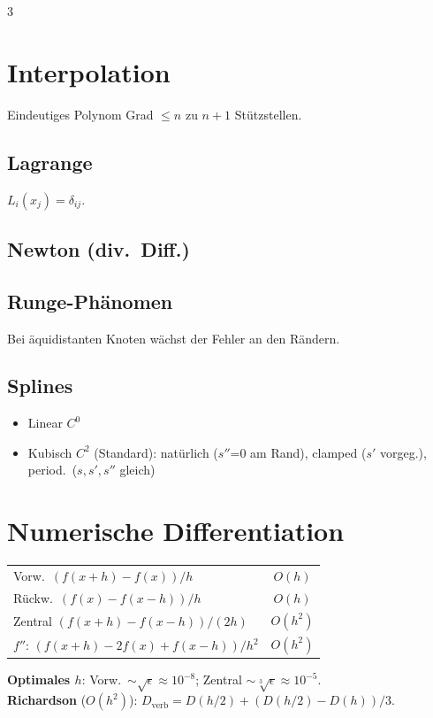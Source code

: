 \documentclass[8pt,a4paper]{extarticle}
\begin{document}
\begin{multicols*}{3}
\section{Interpolation}
Eindeutiges Polynom Grad $\le n$ zu $n{+}1$ St\"utzstellen.

\subsection{Lagrange}
$L_i(x_j)=\delta_{ij}$.

\subsection{Newton (div.\ Diff.)}

\subsection{Runge-Ph\"anomen}
Bei \"a\-qui\-di\-stan\-ten Knoten w\"achst der Fehler an den R\"andern.

\subsection{Splines}
\begin{itemize}
\item Linear $C^0$
\item Kubisch $C^2$ (Standard): nat\"urlich ($s''$=0 am Rand), clamped ($s'$ vorgeg.), period.\ ($s,s',s''$ gleich)
\end{itemize}

\section{Numerische Differentiation}
\begin{tabularx}{\linewidth}{@{}l@{\ }c@{}}
Vorw.\ $(f(x{+}h){-}f(x))/h$ & $O(h)$ \\
R\"uckw.\ $(f(x){-}f(x{-}h))/h$ & $O(h)$ \\
Zentral $(f(x{+}h){-}f(x{-}h))/(2h)$ & $O(h^2)$ \\
$f''$: $(f(x{+}h){-}2f(x){+}f(x{-}h))/h^2$ & $O(h^2)$ \\
\end{tabularx}
\textbf{Optimales $h$}: Vorw.\ $\sim\!\sqrt\epsilon\!\approx\!10^{-8}$; Zentral $\sim\!\sqrt[3]\epsilon\!\approx\!10^{-5}$.\\
\textbf{Richardson} ($O(h^2)$): $D_{\text{verb}}=D(h/2)+(D(h/2)-D(h))/3$.


\end{multicols*}
\end{document}

